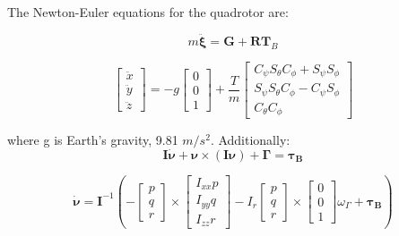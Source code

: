 \documentclass[letterpaper, 10 pt, conference]{ieeeconf}  %
\begin{document}
The Newton-Euler equations for the quadrotor are:

$$m \ddot{\boldsymbol{\xi}}=\boldsymbol{G}+\boldsymbol{R} \boldsymbol{T}_{B}$$

$$\left[ \begin{array}{c}{\ddot{x}} \\ {\ddot{y}} \\ {\ddot{z}}\end{array}\right]=-g \left[ \begin{array}{l}{0} \\ {0} \\ {1}\end{array}\right]+\frac{T}{m} \left[ \begin{array}{c}{C_{\psi} S_{\theta} C_{\phi}+S_{\psi} S_{\phi}} \\ {S_{\psi} S_{\theta} C_{\phi}-C_{\psi} S_{\phi}} \\ {C_{\theta} C_{\phi}}\end{array}\right]$$

where g is Earth's gravity, 9.81 $m/s^2$. Additionally:
 $$\boldsymbol{I} \dot{\boldsymbol{\nu}}+\boldsymbol{\nu} \times(\boldsymbol{I} \boldsymbol{\nu})+\mathbf{\Gamma}=\boldsymbol{\tau_B}$$
 
 $$\boldsymbol{\dot{\nu}}=\boldsymbol{I}^{-1}\left(-\left[ \begin{array}{c}{p} \\ {q} \\ {r}\end{array}\right] \times \left[ \begin{array}{c}{I_{x x} p} \\ {I_{y y} q} \\ {I_{z z} r}\end{array}\right]-I_{r} \left[ \begin{array}{c}{p} \\ {q} \\ {r}\end{array}\right] \times \left[ \begin{array}{c}{0} \\ {0} \\ {1}\end{array}\right] \omega_{\Gamma}+\boldsymbol{\tau_B}\right)$$
 
\end{document}
